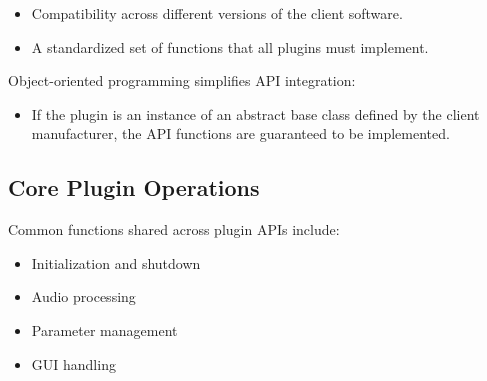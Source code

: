 \begin{itemize}
    \item Compatibility across different versions of the client software.
    \item A standardized set of functions that all plugins must implement.
\end{itemize}

Object-oriented programming simplifies API integration:

\begin{itemize}
    \item If the plugin is an instance of an abstract base class defined by the client manufacturer, the API functions are guaranteed to be implemented.
\end{itemize}

\subsection{Core Plugin Operations}

Common functions shared across plugin APIs include:

\begin{itemize}
    \item Initialization and shutdown
    \item Audio processing
    \item Parameter management
    \item GUI handling
\end{itemize}